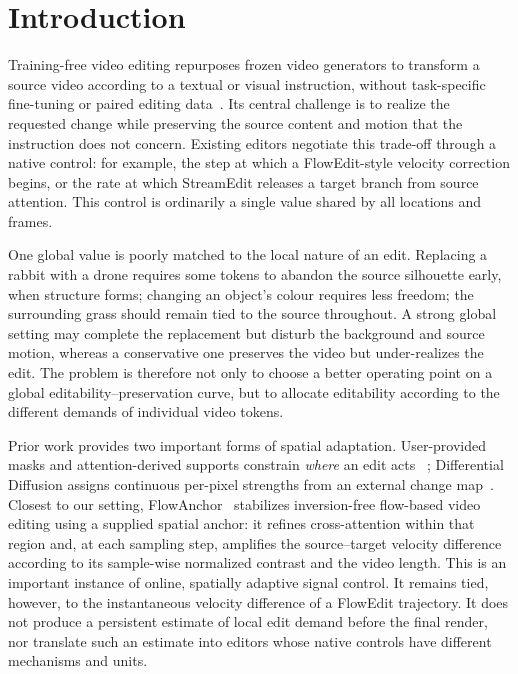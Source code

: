 
\section{Introduction}
\label{sec:intro}

Training-free video editing repurposes frozen video generators to transform a
source video according to a textual or visual instruction, without task-specific
fine-tuning or paired editing data~\cite{wan2025,selfforcing2025,flowedit,
tokenflow2024,streamedit2026}. Its central challenge is to realize the requested
change while preserving the source content and motion that the instruction does
not concern. Existing editors negotiate this trade-off through a native control:
for example, the step at which a FlowEdit-style velocity correction begins, or
the rate at which StreamEdit releases a target branch from source attention.
This control is ordinarily a single value shared by all locations and frames.

One global value is poorly matched to the local nature of an edit. Replacing a
rabbit with a drone requires some tokens to abandon the source silhouette early,
when structure forms; changing an object's colour requires less freedom; the
surrounding grass should remain tied to the source throughout. A strong global
setting may complete the replacement but disturb the background and source
motion, whereas a conservative one preserves the video but under-realizes the
edit. The problem is therefore not only to choose a better operating point on a
global editability--preservation curve, but to allocate editability according to
the different demands of individual video tokens.

Prior work provides two important forms of spatial adaptation. User-provided
masks and attention-derived supports constrain \emph{where} an edit acts
~\cite{objwiper,flowdirector}; Differential Diffusion assigns continuous
per-pixel strengths from an external change map~\cite{diffdiff}. Closest to our
setting, FlowAnchor~\cite{flowanchor} stabilizes inversion-free flow-based video
editing using a supplied spatial anchor: it refines cross-attention within that
region and, at each sampling step, amplifies the source--target velocity
difference according to its sample-wise normalized contrast and the video
length. This is an important instance of online, spatially adaptive signal
control. It remains tied, however, to the instantaneous velocity difference of
a FlowEdit trajectory. It does not produce a persistent estimate of local edit
demand before the final render, nor translate such an estimate into editors
whose native controls have different mechanisms and units.

